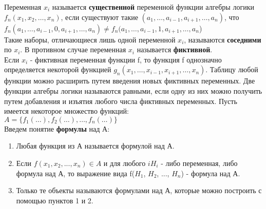 Переменная $x_{i}$ называется \textbf{существенной} переменной функции алгебры логики $f_{n} (x_{1}, x_{2}, \ldots, x_{n})$, если существуют такие $(a_{1}, \ldots,a_{i-1}, a_{i+1}, \ldots, a_{n})$, что \\
    $f_{n} (a_{1},\ldots,a_{i-1}, 0, a_{i+1}, \ldots, a_{n}) \neq f_{n} (a_{1},\ldots ,a_{i-1}, 1, a_{i+1}, \ldots, a_{n}$) \\
Такие наборы, отличающиеся лишь одной переменной $x_{i}$, называются \textbf{соседними} по $x_{i}$. В противном случае переменная $x_{i}$ называется \textbf{фиктивной}. \\
Если $x_{i}$ - фиктивная переменная функции f, то функция f однозначно определяется некоторой функцией $g_{n} (x_{1}, \ldots ,x_{i-1}, x_{i+1}, \ldots, x_{n})$. Таблицу любой функции можно расширить путем введения новых фиктивных переменных. 
Две функции алгебры логики называются равными, если одну из них можно получить путем добавления и изъятия любого числа фиктивных переменных. 
Пусть имеется некоторое множество функций: \\
$A = \{f_{1}(\ldots), f_{2}(\ldots), \ldots, f_{n}(\ldots)\}$\\
Введем понятие \textbf{формулы} над А: 
\begin{enumerate}
    \item Любая функция из А называется формулой над А. 
    \item Если $f(x_{1}, x_{2}, ..., x_{n}) \in A$ и для любого $i H_{i}$ - либо переменная, либо формула над А, то выражение вида f($H_{1}$, $H_{2}$, ..., $H_{n}$) - формула над А. 
    \item Только те объекты называются формулами над А, которые можно построить с помощью пунктов 1 и 2. 
\end{enumerate}

